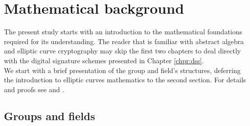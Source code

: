 \chapter{Mathematical background}
\label{chpr:math}
The present study starts with an introduction to the mathematical foundations required for its understanding. The reader that is familiar with abstract algebra and elliptic curve cryptography may skip the first two chapters to deal directly with the digital signature schemes presented in Chapter \ref{chpr:dss}.
\\
We start with a brief presentation of the group and field's structures, deferring the introduction to elliptic curves mathematics to the second section. For details and proofs see \cite{RefWork:20} and \cite{RefWork:1}.

\bigskip

\section{Groups and fields}
\label{groupsfields}

